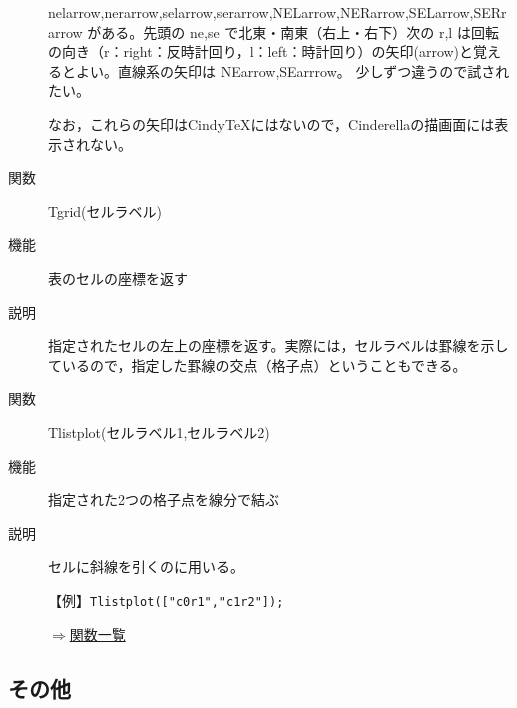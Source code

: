 \documentclass[papersize,a4paper,12pt,uplatex]{jsarticle}
\begin{document}
\begin{description}
nelarrow,nerarrow,selarrow,serarrow,NELarrow,NERarrow,SELarrow,SERrarrow がある。先頭の ne,se で北東・南東（右上・右下）次の r,l は回転の向き（r：right：反時計回り，l：left：時計回り）の矢印(arrow)と覚えるとよい。直線系の矢印は NEarrow,SEarrrow。 少しずつ違うので試されたい。

なお，これらの矢印はCindyTeXにはないので，Cinderellaの描画面には表示されない。

  
\vspace{\baselineskip}
\hypertarget{tgrid}{}
\item[関数]  Tgrid(セルラベル)
\item[機能]  表のセルの座標を返す
\item[説明]  指定されたセルの左上の座標を返す。実際には，セルラベルは罫線を示しているので，指定した罫線の交点（格子点）ということもできる。

\vspace{\baselineskip}
\hypertarget{tlistplot}{}
\item[関数]  Tlistplot(セルラベル1,セルラベル2)
\item[機能]  指定された2つの格子点を線分で結ぶ
\item[説明]  セルに斜線を引くのに用いる。

\vspace{\baselineskip}
【例】\verb|Tlistplot(["c0r1","c1r2"]);| 
    
\vspace{\baselineskip}
\begin{flushright}  \hyperlink{functionlist}{$\Rightarrow$関数一覧}\end{flushright}

\end{description}

\subsection{その他}
\end{document}

